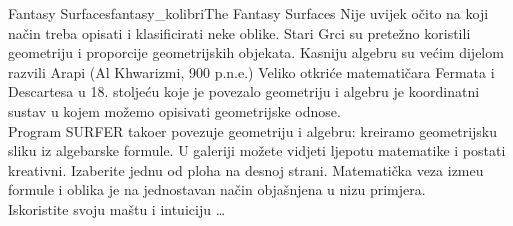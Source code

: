 \begin{surferIntroPage}{Fantasy Surfaces}{fantasy_kolibri}{The Fantasy Surfaces}
Nije uvijek o\v{c}ito na koji na\v{c}in treba opisati i klasificirati neke oblike. Stari Grci su prete\v{z}no koristili geometriju i proporcije geometrijskih objekata. Kasniju algebru su ve\'{c}im dijelom razvili Arapi (Al Khwarizmi, 900 p.n.e.) Veliko otkri\'{c}e matemati\v{c}ara Fermata i Descartesa u 18. stolje\'{c}u koje je povezalo geometriju i algebru je koordinatni sustav u kojem mo\v{z}emo opisivati geometrijske odnose.   \\
\vspace{0.4cm}
Program SURFER tako\dj{}er povezuje geometriju i algebru: kreiramo geometrijsku sliku iz algebarske formule.
U galeriji mo\v{z}ete vidjeti ljepotu matematike i postati kreativni. Izaberite jednu od ploha na desnoj strani. Matemati\v{c}ka veza izme\dj{}u formule i oblika je na jednostavan na\v{c}in obja\v{s}njena u nizu primjera.
\\
Iskoristite svoju ma\v{s}tu i intuiciju \dots
\end{surferIntroPage}
